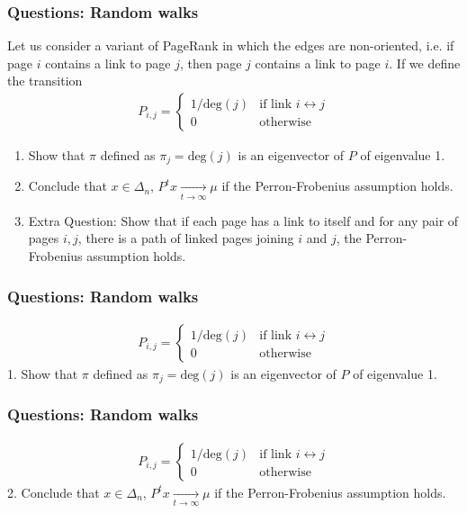 \documentclass{beamer}
\begin{document}
\begin{frame}[t]
\frametitle{Questions: Random walks}
Let us consider a variant of PageRank in which the edges are non-oriented, i.e. if page $i$ contains a link to page $j$, then page $j$ contains a link to page $i$. If we define the transition 
\begin{align*}
P_{i,j} =
\begin{cases}
1/\text{deg}(j) &\text{if link } i \leftrightarrow j  \\
0 &\text{otherwise}
\end{cases}
\end{align*}
\begin{enumerate}
\item Show that $\pi$ defined as $\pi_j = \text{deg}(j)$ is an eigenvector of $P$ of eigenvalue 1.
\item Conclude that $x \in \Delta_n$,  $P^t x \xrightarrow[t \to \infty]{} \mu$ if the Perron-Frobenius assumption holds.
\item Extra Question: Show that if each page has a link to itself and for any pair of pages $i,j$, there is a path of linked pages joining $i$ and $j$, the Perron-Frobenius assumption holds.
\end{enumerate}
\end{frame}

\begin{frame}[t]
\frametitle{Questions: Random walks}
\vspace{-10pt}
\begin{align*}
P_{i,j} =
\begin{cases}
1/\text{deg}(j) &\text{if link } i \leftrightarrow j  \\
0 &\text{otherwise}
\end{cases}
\end{align*}
1. Show that $\pi$ defined as $\pi_j = \text{deg}(j)$ is an eigenvector of $P$ of eigenvalue 1.
\end{frame}

\begin{frame}[t]
\frametitle{Questions: Random walks}
\vspace{-10pt}
\begin{align*}
P_{i,j} =
\begin{cases}
1/\text{deg}(j) &\text{if link } i \leftrightarrow j  \\
0 &\text{otherwise}
\end{cases}
\end{align*}
2. Conclude that $x \in \Delta_n$,  $P^t x \xrightarrow[t \to \infty]{} \mu$ if the Perron-Frobenius assumption holds.
\end{frame}
\end{document}
